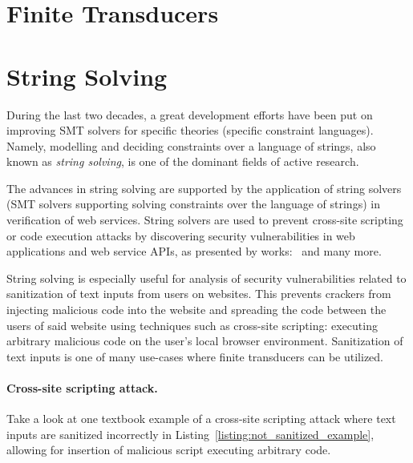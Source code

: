 \section{Finite Transducers}

\section{String Solving}

During the last two decades, a great development efforts have been put on improving SMT solvers for specific theories (specific constraint languages).
Namely, modelling and deciding constraints over a language of strings, also known as \emph{string solving}, is one of the dominant fields of active research.

The advances in string solving are supported by the application of string solvers (SMT solvers supporting solving constraints over the language of strings) in verification of web services.
String solvers are used to prevent cross-site scripting or code execution attacks by discovering security vulnerabilities in web applications and web service APIs, as presented by works:~\cite{String_constraints_with_concatenation_and_transducers_solved_efficiently, Composing_Static_and_Dynamic_Analysis_to_Validate_Sanitization_in_Web_Applications, Satisfiability_Modulo_Theories_Introduction_and_Applications, Simple_linear_string_constraints,Z3-str_a_z3-based_string_solver_for_web_application_analysis,S3_A_Symbolic_String_Solver_for_Vulnerability_Detection_in_Web_Applications} and many more.

String solving is especially useful for analysis of security vulnerabilities related to sanitization of text inputs from users on websites.
This prevents crackers from injecting malicious code into the website and spreading the code between the users of said website using techniques such as cross-site scripting: executing arbitrary malicious code on the user's local browser environment.
Sanitization of text inputs is one of many use-cases where finite transducers can be utilized.

\paragraph{Cross-site scripting attack.}
Take a look at one textbook example of a cross-site scripting attack where text inputs are sanitized incorrectly in Listing~\ref{listing:not_sanitized_example}, allowing for insertion of malicious script executing arbitrary code.

